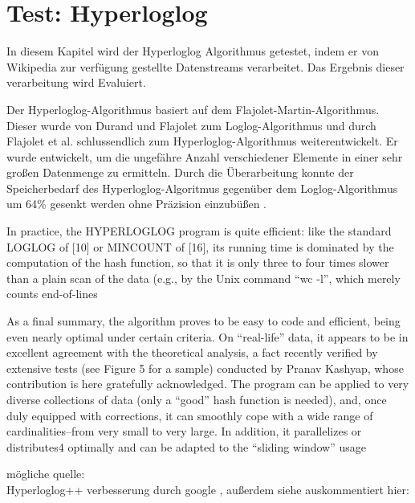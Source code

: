 \section{Test: Hyperloglog}
In diesem Kapitel wird der Hyperloglog Algorithmus getestet, 
indem er von Wikipedia zur verfügung gestellte Datenstreams verarbeitet. 
Das Ergebnis dieser verarbeitung wird Evaluiert. 

Der Hyperloglog-Algorithmus basiert auf dem Flajolet-Martin-Algorithmus.
Dieser wurde von Durand und Flajolet \cite{durand2003} zum Loglog-Algorithmus 
und durch Flajolet et al. \cite{flajolet2007} schlussendlich zum Hyperloglog-Algorithmus weiterentwickelt.
Er wurde entwickelt, um die ungefähre Anzahl verschiedener Elemente in einer sehr großen Datenmenge zu ermitteln. 
Durch die Überarbeitung konnte der Speicherbedarf des Hyperloglog-Algoritmus 
gegenüber dem Loglog-Algorithmus um 64\% gesenkt werden ohne Präzision einzubüßen \cite{flajolet2007}. 


In practice, the HYPERLOGLOG program is quite efficient: like the standard LOGLOG of [10] or
MINCOUNT of [16], its running time is dominated by the computation of the hash function, so that it is
only three to four times slower than a plain scan of the data (e.g., by the Unix command “wc -l”, which
merely counts end-of-lines \cite{flajolet2007}

As a final summary, the algorithm proves to be easy to code and efficient, being even nearly optimal
under certain criteria. On “real-life” data, it appears to be in excellent agreement with the theoretical analysis,
a fact recently verified by extensive tests (see Figure 5 for a sample) conducted by Pranav Kashyap,
whose contribution is here gratefully acknowledged.
The program can be applied to very diverse collections
of data (only a “good” hash function is needed), and, once duly equipped with corrections, it can
smoothly cope with a wide range of cardinalities–from very small to very large. In addition, it parallelizes
or distributes4 optimally and can be adapted to the “sliding window” usage \cite{flajolet2007}

mögliche quelle: \\
Hyperloglog++ verbesserung durch google \cite{heule2013},
außerdem siehe auskommentiert hier:
